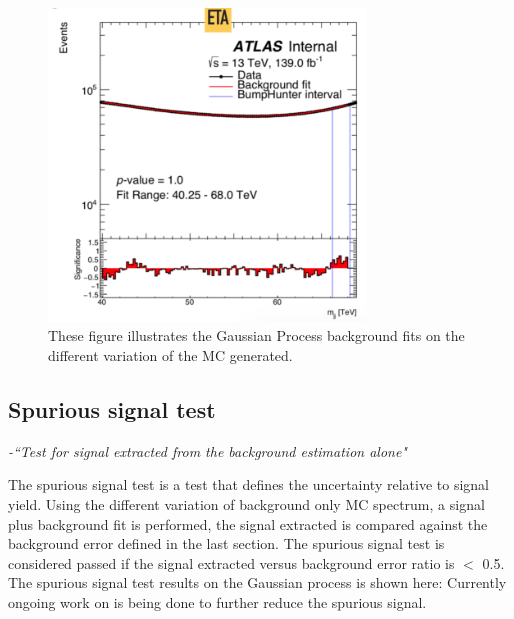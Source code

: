\begin{figure}[!htb]
\begin{center}
        \includegraphics[width=0.75\textwidth]{figures/chapter_dimuon/EtaVariation}
        \caption{
        These figure illustrates the Gaussian Process background fits on the different variation of the MC generated. }
    \end{center}
\end{figure}

\subsection{Spurious signal test}
\textit{-``Test for signal extracted from the background estimation alone"}

The spurious signal test is a test that defines the uncertainty relative to signal yield. 
Using the different variation of background only MC spectrum, a signal plus background fit is performed, the signal extracted is compared against the background error defined in the last section. The spurious signal test is considered passed if the signal extracted versus background error ratio is $<$ 0.5.
The spurious signal test results on the Gaussian process is shown here:
Currently ongoing work on is being done to further reduce the spurious signal.

